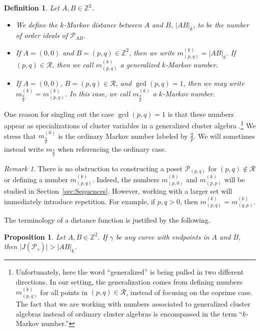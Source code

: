 \documentclass{article}
\newtheorem{definition}[theorem]{Definition}
\newtheorem{prop}[theorem]{Proposition}
\theoremstyle{remark}
\newtheorem{remark}[theorem]{Remark}
\newcommand{\fqp}{\frac{q}{p}}
\newcommand{\calP}{\mathcal{P}}
\begin{document}
\begin{definition}\label{def:kMarkovDistance}
Let $A,B \in \mathbb{Z}^2$. 
\begin{itemize}
    \item  We define the \emph{$k$-Markov distance} between $A$ and $B$, $\vert AB \vert_k$, to be the number of order ideals of $\calP_{AB}$.
    \item  If $A = (0,0)$ and $B = (p,q) \in \mathbb{Z}^2$, then we write $m^{(k)}_{(p,q)} = \vert AB \vert_k$. If $(p,q) \in \mathcal{R}$, then we call $m^{(k)}_{(p,q)}$ a \emph{generalized $k$-Markov number}.
    \item If $A = (0,0)$, $B = (p,q) \in \mathcal{R}$, and $\gcd(p,q) = 1$,  then we may write $m^{(k)}_{\fqp} = m^{(k)}_{(p,q)}$. In this case, we call $m^{(k)}_{\fqp}$ a \emph{$k$-Markov number}.
\end{itemize}
\end{definition}


One reason for singling out the case $\gcd(p,q) = 1$ is that these numbers appear as specializations of cluster variables in a generalized cluster algebra \cite{BG}.\footnote{Unfortunately, here the word ``generalized'' is being pulled in two different directions. In our setting, the generalization comes from defining numbers $m^{(k)}_{(p,q)}$ for all points in $(p,q) \in \mathcal{R}$, instead of focusing on the coprime case. The fact that we are working with numbers associated to generalized cluster algebras instead of ordinary cluster algebras is encompassed in the term ``$k$-Markov number.''} We stress that $m^{(0)}_{\fqp}$ is the ordinary Markov number labeled by $\fqp$. We will sometimes instead write $m_{\fqp}$ when referencing the ordinary case.

\begin{remark}
There is no obstruction to constructing a poset $\calP_{(p,q)}$ for $(p,q) \notin \mathcal{R}$ or defining a number $m^{(k)}_{(p,q)}$. Indeed, the numbers $m^{(k)}_{(p,0)}$ and $m^{(k)}_{(p,p)}$ will be studied in Section~\ref{sec:Sequences}. However, working with a larger set will immediately introduce repetition. For example, if $p,q > 0$, then $m^{(k)}_{(p,q)} = m^{(k)}_{(q,p)}$.
\end{remark} 

The terminology of a  distance function is justified by the following. 

\begin{prop}\label{prop:Straight}
Let $A,B \in \mathbb{Z}^2$. If $\gamma$ be any curve with endpoints in $A$ and $B$, then $\vert J(\calP_\gamma) \vert > \vert AB \vert_k$.
\end{prop}
\end{document}
